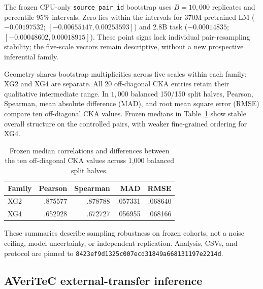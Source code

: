 The frozen CPU-only \texttt{source\_pair\_id} bootstrap uses $B=10{,}000$
replicates and percentile 95\% intervals. Zero lies within the intervals
for 370M pretrained LM ($-0.00197532$; $[-0.00655147,0.00253593]$)
and 2.8B task ($-0.00014835$; $[-0.00048602,0.00018915]$). These point
signs lack individual pair-resampling stability; the five-scale vectors
remain descriptive, without a new prospective inferential family.

Geometry shares bootstrap multiplicities across five scales within each
family; XG2 and XG4 are separate. All 20 off-diagonal CKA entries retain
their qualitative intermediate range. In $1{,}000$ balanced 150/150
split halves, Pearson, Spearman, mean absolute difference (MAD), and root
mean square error (RMSE) compare ten off-diagonal CKA values. Frozen
medians in Table~\ref{tab:robustness} show stable overall structure on
the controlled pairs, with weaker fine-grained ordering for XG4.

\begin{table}[h]
\centering\small
\caption{Frozen median correlations and differences between the ten
off-diagonal CKA values across 1,000 balanced split halves.}
\label{tab:robustness}
\begin{tabular}{lrrrr}
\toprule
Family & Pearson & Spearman & MAD & RMSE \\
\midrule
XG2 & .875577 & .878788 & .057331 & .068640 \\
XG4 & .652928 & .672727 & .056955 & .068166 \\
\bottomrule
\end{tabular}
\end{table}

These summaries describe sampling robustness on frozen cohorts, not a
noise ceiling, model uncertainty, or independent replication. Analysis,
CSVs, and protocol are pinned to
\nolinkurl{8423ef9d1325c007ecd31849a668131197e2214d}.

\subsection{AVeriTeC external-transfer inference}
\label{app:external}

